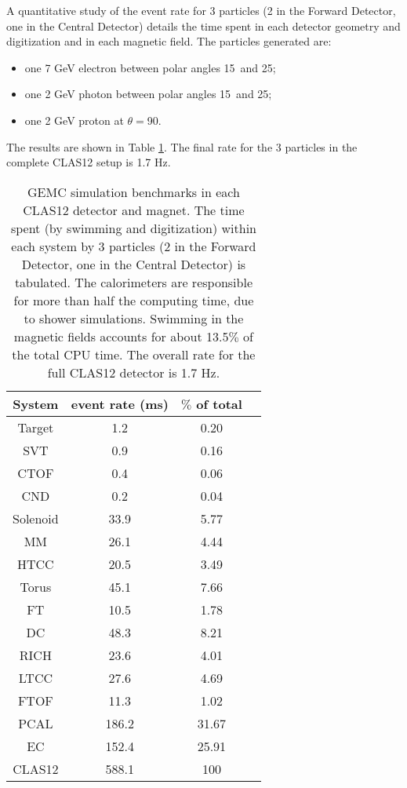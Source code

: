 A quantitative study of the event rate for 3 particles (2 in the Forward Detector, one in the Central Detector)
details the time spent in each detector geometry and digitization and in each magnetic field.
The particles generated are:

\begin{itemize}
	\item one 7 GeV electron between polar angles 15\mdeg \ and 25\mdeg;
	\item one 2 GeV photon between polar angles 15\mdeg \ and 25\mdeg;
	\item one 2 GeV proton at $\theta=$90\mdeg.
\end{itemize}

The results are shown in Table \ref{tab:benchmarks}. The final rate for the 3 particles in the
complete CLAS12 setup is 1.7 Hz.

\begin{table}[h]
	\begin{center}
		\begin{tabular}{ c | c | c | c }
			 \hline \hline
System	 & event rate (ms)   &  $\%$ of total\\
			\hline
Target   &  1.2   & 0.20  \\
SVT      &  0.9   & 0.16  \\
CTOF     &  0.4   & 0.06  \\
CND      &  0.2   & 0.04  \\
Solenoid &  33.9  & 5.77  \\
MM       &  26.1  & 4.44  \\
HTCC     &  20.5  & 3.49  \\
Torus    &  45.1  & 7.66  \\
FT       &  10.5  & 1.78  \\
DC       &  48.3  & 8.21  \\
RICH     &  23.6  & 4.01  \\
LTCC     &  27.6  & 4.69  \\
FTOF     &  11.3  & 1.02  \\
PCAL     &  186.2 & 31.67 \\
EC       &  152.4 & 25.91 \\
		\hline
CLAS12   &  588.1 & 100 \\
		\hline \hline
		\end{tabular}
	\end{center}
	\caption{GEMC simulation benchmarks in each CLAS12 detector and magnet.
             The time spent (by swimming and digitization)
             within each system by 3 particles
             (2 in the Forward Detector, one in the Central Detector) is tabulated.
             The calorimeters are responsible for more than
             half the computing time, due to shower simulations.
             Swimming in the magnetic fields accounts for about 13.5$\%$ of the total CPU time.
			 The overall rate for the full CLAS12 detector is 1.7 Hz.
}
\label{tab:benchmarks}
\end{table}

